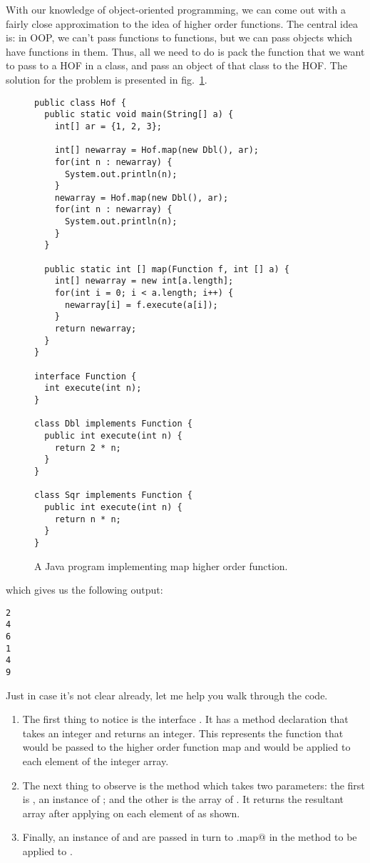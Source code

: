 \documentclass[12pt,a4paper]{article}
\begin{document}
With our knowledge of object-oriented programming, we can come out with a fairly close approximation to the idea of higher order functions. The central idea is: in OOP, we can't pass functions to functions, but we can pass objects which have functions in them. Thus, all we need to do is pack the function that we want to pass to a HOF in a class, and pass an object of that class to the HOF.
The solution for the problem is presented in fig.~\ref{f:hof4}.
\begin{figure}[H]
\begin{lstlisting}[frame=single]
public class Hof {
  public static void main(String[] a) {
    int[] ar = {1, 2, 3};

    int[] newarray = Hof.map(new Dbl(), ar);
    for(int n : newarray) {
      System.out.println(n);
    }
    newarray = Hof.map(new Dbl(), ar);
    for(int n : newarray) {
      System.out.println(n);
    }
  }

  public static int [] map(Function f, int [] a) {
    int[] newarray = new int[a.length];
    for(int i = 0; i < a.length; i++) {
      newarray[i] = f.execute(a[i]);
    }
    return newarray;
  }
}

interface Function {
  int execute(int n);
}

class Dbl implements Function {
  public int execute(int n) {
    return 2 * n;
  }
}

class Sqr implements Function {
  public int execute(int n) {
    return n * n;
  }
}
\end{lstlisting}
\caption{A Java program implementing map higher order function.}
\label{f:hof4}
\end{figure}

which gives us the following output:
\begin{lstlisting}[frame=single]
2
4
6
1
4
9
\end{lstlisting}

Just in case it's not clear already, let me help you walk through the code.
\begin{enumerate}
	\item The first thing to notice is the interface \lstinline@Function@. It has a method declaration \lstinline@execute@ that takes an integer and returns an integer. This represents the function that would be passed to the higher order function map and would be applied to each element of the integer array.
	\item The next thing to observe is the \lstinline@map@ method which takes two parameters: the first is \lstinline@f@, an instance of \lstinline@Function@; and the other is the array of \lstinline@int@s \lstinline@a@. It returns the resultant array after applying \lstinline@f@ on each element of \lstinline@a@ as shown.
	\item Finally, an instance of \lstinline@Dbl@ and \lstinline@Sqr@ are passed in turn to \lstinline@Hof.map@ in the \lstinline@main@ method to be applied to \lstinline@array@.
\end{enumerate}
\end{document}
